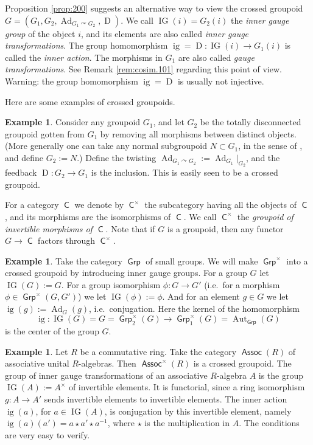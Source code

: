 \documentclass[a4paper, 10pt]{amsart}
\theoremstyle{definition}
\newtheorem{exa}[equation]{Example}
\numberwithin{equation}{section}
\newcommand{\opn}{\operatorname}
\newcommand{\cat}[1]{\operatorname{\mathsf{#1}}}
\newcommand{\crvar}{\curvearrowright}
\begin{document}
Proposition \ref{prop:200} suggests an alternative way to view the crossed 
groupoid $G = ( G_1, G_2, \opn{Ad}_{G_1 \crvar G_{2}}, \opn{D} )$.
We call $\opn{IG}(i) = G_2(i)$ the {\em inner gauge group} of the object $i$,
and its elements are also called {\em inner gauge transformations}. 
The group homomorphism 
$\opn{ig} = \opn{D} : \opn{IG}(i) \to G_1(i)$ is called the {\em inner action}. 
The morphisms in $G_1$ are also called {\em gauge transformations}. 
See Remark \ref{rem:cosim.101} regarding this point of view. 
Warning: the group
homomorphism $\opn{ig} = \opn{D}$
is usually not injective. 

Here are some examples of crossed groupoids.

\begin{exa} \label{exa:200}
Consider any groupoid $G_1$, and let $G_2$ be the totally disconnected
groupoid gotten from $G_1$ by removing all morphisms between distinct objects. 
(More generally one can take any normal subgroupoid $N \subset G_1$, in the
sense of \cite[Definition 3.1]{Ye4}, and define $G_2 := N$.)
Define the twisting  
$\opn{Ad}_{G_1 \crvar G_{2}} := {\opn{Ad}_{G_1}}|_{G_{2}}$,
and the feedback $\opn{D} : G_2 \to G_1$ is the inclusion. 
This is easily seen to be a crossed groupoid. 
\end{exa}

For a category $\cat{C}$ we denote by $\cat{C}^{\times}$ the subcategory having
all the objects of $\cat{C}$, and its morphisms are the isomorphisms of
$\cat{C}$. We call  $\cat{C}^{\times}$ the {\em groupoid of invertible
morphisms of $\cat{C}$}. 
Note that if $G$ is a groupoid, then any functor $G \to \cat{C}$ factors
through $\cat{C}^{\times}$.

\begin{exa} \label{exa:15}
Take the category $\cat{Grp}$ of small groups. We will make $\cat{Grp}^{\times}$
into a crossed groupoid  by introducing inner gauge groups. 
For a group $G$ let $\opn{IG}(G) := G$.
For a group isomorphism $\phi : G \to G'$ (i.e.\ for a morphism
$\phi \in \cat{Grp}^{\times}(G, G')$) we let 
$\opn{IG}(\phi) := \phi$. And for an element $g \in G$  we let
$\opn{ig}(g) := \opn{Ad}_G(g)$, i.e.\ conjugation.
Here the kernel of the homomorphism 
\[ \opn{ig} : \opn{IG}(G) = G = \cat{Grp}^{\times}_2(G)
\to \cat{Grp}^{\times}_1(G) = \opn{Aut}_{\cat{Grp}}(G) \]
is the center of the group $G$.
\end{exa}

\begin{exa} \label{exa:6}
Let $R$ be a commutative ring. Take the category $\cat{Assoc}(R)$
of associative unital $R$-algebras. Then $\cat{Assoc}^{\times}(R)$
is a crossed groupoid. 
The group of inner gauge transformations of an associative $R$-algebra $A$ is
the group $\opn{IG}(A) := A^{\times}$
of invertible elements. It is functorial, since a ring isomorphism 
$g : A \to A'$ sends invertible elements to invertible elements.
The inner action $\opn{ig}(a)$, for 
$a \in \opn{IG}(A)$, is conjugation by this invertible element, namely
$\opn{ig}(a)(a') = a \star a' \star a^{-1}$,
where $\star$ is the multiplication in $A$.
The conditions are very easy to verify.
\end{exa}
\end{document}
